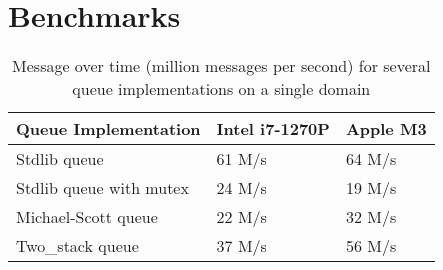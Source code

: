 \documentclass[a4paper, 11pt]{article}
\begin{document}
% 
\section{Benchmarks}




\newcommand{\best}[1]{\cellcolor{green!25}#1}
\newcommand{\worst}[1]{\cellcolor{red!25}#1}

\begin{table}[htbp]
  \centering
  \begin{tabular}{|l|l|l|}
    \hline
    \textbf{Queue Implementation} & \textbf{Intel i7-1270P} & \textbf{Apple M3} \\ \hline
    Stdlib queue                  & \best{61 M/s}           & \best{64 M/s}     \\ \hline
    Stdlib queue with mutex       & 24 M/s                  & \worst{19 M/s}    \\ \hline
    Michael-Scott queue           & \worst{22 M/s}          & 32 M/s            \\ \hline
    Two\_stack queue              & 37 M/s                  & 56 M/s            \\ \hline
  \end{tabular}
  \caption{Message over time (million messages per second) for several queue implementations on a single domain}
  \label{tab:queue-benchmarks-one-domain}
\end{table}
\end{document}

